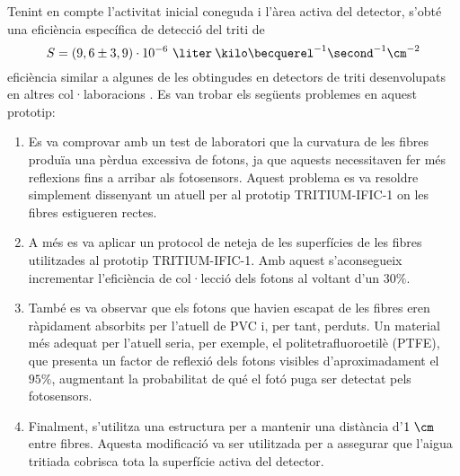 Tenint en compte l'activitat inicial coneguda i l'àrea activa del detector, s'obté una eficiència específica de detecció del triti de
$$S = (9,6 \pm 3,9)\cdot{} 10^{-6}~\liter\:\kilo\becquerel^{-1}\second^{-1}\cm^{-2}$$
eficiència similar a algunes de les obtingudes en detectors de triti desenvolupats en altres col·laboracions \cite{Muramatsu, Moghissi}. Es van trobar els següents problemes en aquest prototip:

\begin{enumerate}
\item{} Es va comprovar amb un test de laboratori que la curvatura de les fibres produïa una pèrdua excessiva de fotons, ja que aquests necessitaven fer més reflexions fins a arribar als fotosensors. Aquest problema es va resoldre simplement dissenyant un atuell per al prototip TRITIUM-IFIC-1 on les fibres estigueren rectes.

\item{} A més es va aplicar un protocol de neteja de les superfícies de les fibres utilitzades al prototip TRITIUM-IFIC-1. Amb aquest s'aconsegueix incrementar l'eficiència de col·lecció dels fotons al voltant d'un $30\%$.

\item{} També es va observar que els fotons que havien escapat de les fibres eren ràpidament absorbits per l'atuell de PVC i, per tant, perduts. Un material més adequat per l'atuell seria, per exemple, el politetrafluoroetilè (PTFE), que presenta un factor de reflexió dels fotons visibles d'aproximadament el $95\%$, augmentant la probabilitat de qué el fotó puga ser detectat pels fotosensors.

\item{} Finalment, s'utilitza una estructura per a mantenir una distància d'$1~\cm$ entre fibres. Aquesta modificació va ser utilitzada per a assegurar que l'aigua tritiada cobrisca tota la superfície activa del detector.

\end{enumerate}

